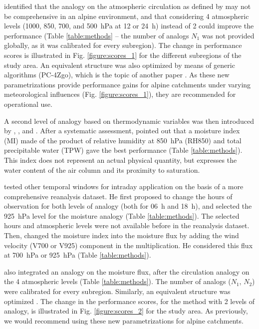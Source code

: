 \documentclass[review]{elsarticle}
\begin{document}
\citet{Horton2012} identified that the analogy on the atmospheric circulation as defined by \citet{Bontron2004} may not be comprehensive in an alpine environment, and that considering 4 atmospheric levels (1000, 850, 700, and 500~hPa at 12 or 24~h) instead of 2 could improve the performance (Table \ref{table:methods} -- the number of analogs $N_{1}$ was not provided globally, as it was calibrated for every subregion). The change in performance scores is illustrated in Fig. \ref{figure:scores_1} for the different subregions of the study area. An equivalent structure was also optimized by means of generic algorithms (PC-4Zgo), which is the topic of another paper \citep{Horton2016b}. As these new parametrizations provide performance gains for alpine catchments under varying meteorological influences (Fig. \ref{figure:scores_1}), they are recommended for operational use.

A second level of analogy based on thermodynamic variables was then introduced by \citet{Mandon1985}, \citet{Vallee1986}, and \citet{Gibergans-Baguena2007}. After a systematic assessment, \citet{Bontron2004} pointed out that a moisture index (MI) made of the product of relative humidity at 850~hPa (RH850) and total precipitable water (TPW) gave the best performance (Table \ref{table:methods}). This index does not represent an actual physical quantity, but expresses the water content of the air column and its proximity to saturation.

\citet{Marty2010} tested other temporal windows for intraday application on the basis of a more comprehensive reanalysis dataset. He first proposed to change the hours of observation for both levels of analogy (both for 06~h and 18~h), and selected the 925~hPa level for the moisture analogy (Table \ref{table:methods}). The selected hours and atmospheric levels were not available before in the reanalysis dataset. Then, \citet{Marty2010} changed the moisture index into the moisture flux by adding the wind velocity (V700 or V925) component in the multiplication. He considered this flux at 700~hPa or 925~hPa (Table \ref{table:methods}).

\citet{Horton2012} also integrated an analogy on the moisture flux, after the circulation analogy on the 4 atmospheric levels (Table \ref{table:methods}). The number of analogs ($N_{1}$, $N_{2}$) were calibrated for every subregion. Similarly, an equivalent structure was optimized \citep[PC-4Zgo-2MIgo,][]{Horton2016b}. The change in the performance scores, for the method with 2 levels of analogy, is illustrated in Fig. \ref{figure:scores_2} for the study area. As previously, we would recommend using these new parametrizations for alpine catchments.
\end{document}
